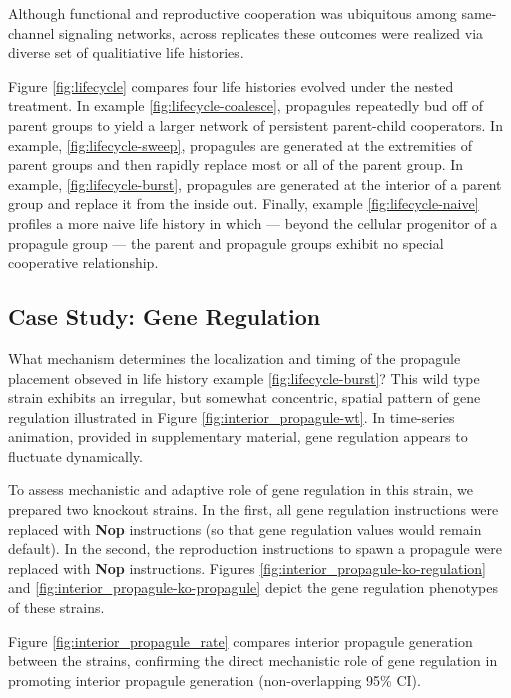 Although functional and reproductive cooperation was ubiquitous among same-channel signaling networks, across replicates these outcomes were realized via diverse set of qualitiative life histories.


Figure \ref{fig:lifecycle} compares four life histories evolved under the nested treatment.
In example \ref{fig:lifecycle-coalesce}, propagules repeatedly bud off of parent groups to yield a larger network of persistent parent-child cooperators.
In example, \ref{fig:lifecycle-sweep}, propagules are generated at the extremities of parent groups and then rapidly replace most or all of the parent group.
In example, \ref{fig:lifecycle-burst}, propagules are generated at the interior of a parent group and replace it from the inside out.
Finally, example \ref{fig:lifecycle-naive} profiles a more naive life history in which --- beyond the cellular progenitor of a propagule group --- the parent and propagule groups exhibit no special cooperative relationship.

\subsection{Case Study: Gene Regulation} \label{sec:gene-regulation}



What mechanism determines the localization and timing of the propagule placement obseved in life history example \ref{fig:lifecycle-burst}?
This wild type strain exhibits an irregular, but somewhat concentric, spatial pattern of gene regulation illustrated in Figure \ref{fig:interior_propagule-wt}.
In time-series animation, provided in supplementary material, gene regulation appears to fluctuate dynamically.

To assess mechanistic and adaptive role of gene regulation in this strain, we prepared two knockout strains.
In the first, all gene regulation instructions were replaced with \textbf{Nop} instructions (so that gene regulation values would remain default).
In the second, the reproduction instructions to spawn a propagule were replaced with \textbf{Nop} instructions.
Figures \ref{fig:interior_propagule-ko-regulation} and \ref{fig:interior_propagule-ko-propagule} depict the gene regulation phenotypes of these strains.

Figure \ref{fig:interior_propagule_rate} compares interior propagule generation between the strains, confirming the direct mechanistic role of gene regulation in promoting interior propagule generation (non-overlapping 95\% CI).

